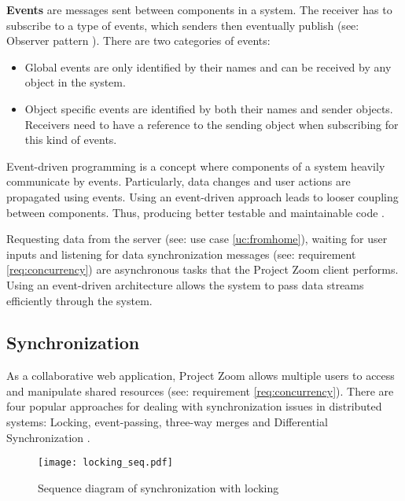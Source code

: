 \textbf{Events} are messages sent between components in a system. The receiver has to subscribe to a type of events, which senders then eventually publish (see: Observer pattern \cite{Gamma_1994}). There are two categories of events:
\begin{itemize}
\item Global events are only identified by their names and can be received by any object in the system.
\item Object specific events are identified by both their names and sender objects. Receivers need to have a reference to the sending object when subscribing for this kind of events.
\end{itemize}

Event-driven programming is a concept where components of a system heavily communicate by events. Particularly, data changes and user actions are propagated using events. Using an event-driven approach leads to looser coupling between components. Thus, producing better testable and maintainable code \cite{Faison_2011}.

Requesting data from the server (see: use case \ref{uc:fromhome}), waiting for user inputs and listening for data synchronization messages (see: requirement \ref{req:concurrency}) are asynchronous tasks that the Project Zoom client performs. Using an event-driven architecture allows the system to pass data streams efficiently through the system.


\subsection{Synchronization}
As a collaborative web application, Project Zoom allows multiple users to access and manipulate shared resources (see: requirement \ref{req:concurrency}). There are four popular approaches for dealing with synchronization issues in distributed systems: Locking, event-passing, three-way merges and Differential Synchronization \cite{Fraser_2009}.

\begin{figure}[!h]
\begin{center}
\texttt{[image: locking\_seq.pdf]}
\caption{Sequence diagram of synchronization with locking}
\label{fig:locking}
\end{center}
\end{figure}

